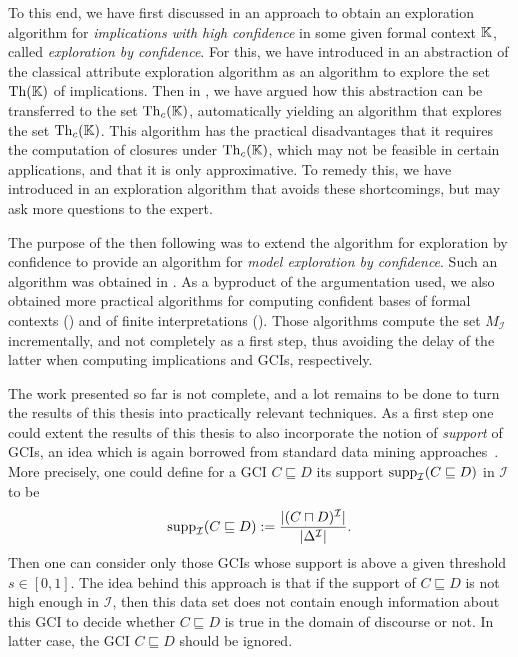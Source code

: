 To this end, we have first discussed in  an approach to obtain an
exploration algorithm for \emph{implications with high confidence} in some given formal
context ${\mathbb{K}}$, called \emph{exploration by confidence}.  For this, we have introduced
in  an abstraction of the classical attribute exploration
algorithm as an algorithm to explore the set $\operatorname{Th}({\mathbb{K}})$ of implications.  Then in
, we have argued how this abstraction can be transferred to the set
$\operatorname{Th}_{c}({\mathbb{K}})$, automatically yielding an algorithm that explores the set $\operatorname{Th}_{c}({\mathbb{K}})$.  This algorithm has the practical disadvantages that it requires the computation of
closures under $\operatorname{Th}_{c}({\mathbb{K}})$, which may not be feasible in certain applications, and
that it is only approximative.  To remedy this, we have introduced in
 an exploration algorithm that avoids these shortcomings, but may
ask more questions to the expert.

The purpose of the then following  was to extend the algorithm
for exploration by confidence to provide an algorithm for \emph{model exploration by
  confidence}.  Such an algorithm was obtained in .  As a
byproduct of the argumentation used, we also obtained more practical algorithms for
computing confident bases of formal contexts () and of finite
interpretations ().  Those algorithms compute the set
$M_{\mathcal{I}}$ incrementally, and not completely as a first step, thus avoiding the
delay of the latter when computing implications and GCIs, respectively.

The work presented so far is not complete, and a lot remains to be done to turn the
results of this thesis into practically relevant techniques.  As a first step one could
extent the results of this thesis to also incorporate the notion of \emph{support} of
GCIs, an idea which is again borrowed from standard data mining
approaches~\cite{arules:agrawal:association-rules}.  More precisely, one could define for
a GCI $C \sqsubseteq D$ its support $\operatorname{supp}_{\mathcal{I}}(C \sqsubseteq D)$ in
$\mathcal{I}$ to be
\begin{equation*}
  \operatorname{supp}_{\mathcal{I}}( C \sqsubseteq D ) := \frac{ \lvert(C \sqcap D)^{\mathcal{I}}\rvert }{
    \lvert \Delta^{\mathcal{I}} \rvert }.
\end{equation*}
Then one can consider only those GCIs whose support is above a given threshold $s \in
[0,1]$.  The idea behind this approach is that if the support of $C \sqsubseteq D$ is not
high enough in $\mathcal{I}$, then this data set does not contain enough information about
this GCI to decide whether $C \sqsubseteq D$ is true in the domain of discourse or not.
In latter case, the GCI $C \sqsubseteq D$ should be ignored.

